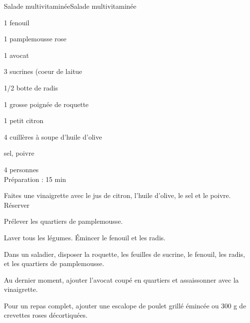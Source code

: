 \begin{recette}{Salade multivitaminée}{Salade multivitaminée}

\begin{ingredients}
1 fenouil\par
1 pamplemousse rose\par
1 avocat\par
3 sucrines (coeur de laitue\par
1/2 botte de radis\par
1 grosse poignée de roquette\par
1 petit citron\par
4 cuillères à soupe d'huile d'olive\par
sel, poivre\par
\end{ingredients}

\begin{infos}
4 personnes\\
Préparation : 15 min\\
\end{infos}

\begin{etapes}
\item Faites une vinaigrette avec le jus de citron, l'huile d'olive, le sel et le poivre. Réserver
\item Prélever les quartiers de pamplemousse.
\item Laver tous les légumes. Émincer le fenouil et les radis.
\item Dans un saladier, disposer la roquette, les feuilles de sucrine, le fenouil, les radis, et les quartiers de pamplemousse.
\item Au dernier moment, ajouter l'avocat coupé en quartiers et assaissonner avec la vinaigrette.
\item Pour un repas complet, ajouter une escalope de poulet grillé émincée ou 300 g de crevettes roses décortiquées.
\end{etapes}

\end{recette}